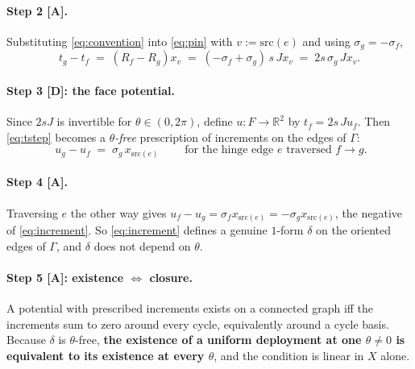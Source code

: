\documentclass[11pt,a4paper]{article}
\theoremstyle{definition}
\begin{document}
\paragraph{Step 2 [A].} Substituting \eqref{eq:convention} into \eqref{eq:pin} with
$v:=\mathrm{src}(e)$ and using $\sigma_g=-\sigma_f$,
\begin{equation}
t_g-t_f \;=\; (R_f-R_g)x_v \;=\; (-\sigma_f+\sigma_g)\,s\,Jx_v \;=\; 2s\,\sigma_g\, J x_v .
\label{eq:tstep}
\end{equation}

\paragraph{Step 3 [D]: the face potential.} Since $2sJ$ is invertible for
$\theta\in(0,2\pi)$, define $u:F\to\mathbb{R}^2$ by $t_f = 2s\,J u_f$. Then
\eqref{eq:tstep} becomes a \emph{$\theta$-free} prescription of increments on the edges of
$\Gamma$:
\begin{equation}
\boxed{\;u_g-u_f \;=\; \sigma_g\, x_{\mathrm{src}(e)}\;}
\qquad\text{for the hinge edge }e\text{ traversed }f\to g .
\label{eq:increment}
\end{equation}

\paragraph{Step 4 [A].} Traversing $e$ the other way gives
$u_f-u_g=\sigma_f x_{\mathrm{src}(e)}=-\sigma_g x_{\mathrm{src}(e)}$, the negative of
\eqref{eq:increment}. So \eqref{eq:increment} defines a genuine $1$-form $\delta$ on the
oriented edges of $\Gamma$, and $\delta$ does not depend on $\theta$.

\paragraph{Step 5 [A]: existence $\Leftrightarrow$ closure.} A potential with prescribed
increments exists on a connected graph iff the increments sum to zero around every cycle,
equivalently around a cycle basis. Because $\delta$ is $\theta$-free, \textbf{the existence
of a uniform deployment at one $\theta\ne0$ is equivalent to its existence at every
$\theta$}, and the condition is linear in $X$ alone.
\end{document}
